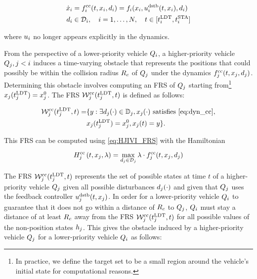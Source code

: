 \begin{equation}
\label{eq:dyn_cc}
\begin{aligned}
\dot \state_i &= \fdyn^\text{cc}_i (t, \state_i, \dstb_i) = \fdyn_i(\state_i, \ctrl^\text{dstb}_i(t,\state_i), \dstb_i) \\
\dstb_i &\in \dset_i, \quad i = 1,\ldots, N, \quad t \in [\ldt_i, \sta_i]
\end{aligned}
\end{equation}

\noindent where $u_i$ no longer appears explicitly in the dynamics.

From the perspective of a lower-priority vehicle $Q_i$, a higher-priority vehicle $Q_j, j < i$ induces a time-varying obstacle that represents the positions that could possibly be within the collision radius $R_c$ of $Q_j$ under the dynamics $f^\text{cc}_j(t, x_j, d_j)$. Determining this obstacle involves computing an FRS of $Q_j$ starting from\footnote{In practice, we define the target set to be a small region around the vehicle's initial state for computational reasons.} $x_j(t^\text{LDT}_j) = x_{j}^0$. The FRS $\mathcal{W}_j^\text{cc}(t^\text{LDT}_j, t)$ is defined as follows:

\begin{equation}
\label{eq:FRS1}
\begin{aligned}
\frs_j^\text{cc}(\ldt_j, t) = & \{y: \exists \dstb_j(\cdot) \in \dfset_j, \state_j(\cdot) \text{ satisfies \eqref{eq:dyn_cc}},\\
& \state_j(\ldt_j) = \state_{j}^0, \state_j(t) = y\}.
\end{aligned}
\end{equation}

This FRS can be computed using \eqref{eq:HJIVI_FRS} with the Hamiltonian

\begin{equation}
H_j^\text{cc}\left(t, x_j, \lambda\right) = \max_{d_j \in \mathcal{D}_j} \lambda \cdot f^\text{cc}_j(t, x_j, d_j)
\end{equation}

The FRS $\mathcal{W}_j^\text{cc}(t^\text{LDT}_j, t)$ represents the set of possible states at time $t$ of a higher-priority vehicle $Q_j$ given all possible disturbances $d_j(\cdot)$ and given that $Q_j$ uses the feedback controller $u_j^\text{dstb}(t, x_j)$. In order for a lower-priority vehicle $Q_i$ to guarantee that it does not go within a distance of $R_c$ to $Q_j$, $Q_i$ must stay a distance of at least $R_c$ away from the FRS $\mathcal{W}_j^\text{cc}(t^\text{LDT}_j, t)$ for all possible values of the non-position states $h_j$. This gives the obstacle induced by a higher-priority vehicle $Q_j$ for a lower-priority vehicle $Q_i$ as follows:

